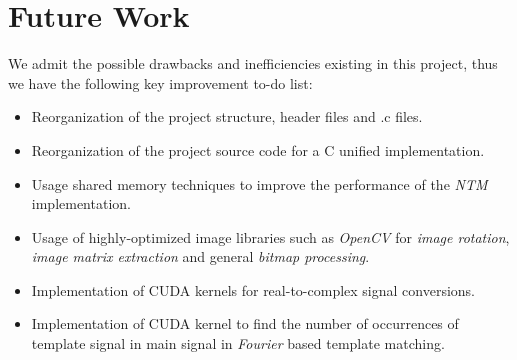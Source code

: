 \chapter{Future Work}
We admit the possible drawbacks and inefficiencies existing in this project, thus we have the following key improvement to-do list:
\begin{itemize}
	\item Reorganization of the project structure, header files and .c files.
	\item Reorganization of the project source code for a C unified implementation.
	\item Usage shared memory techniques to improve the performance of the \textit{NTM} implementation.
	\item Usage of highly-optimized image libraries such as \textit{OpenCV} for \textit{image rotation}, \textit{image matrix extraction} and general \textit{bitmap processing}.
	\item Implementation of CUDA kernels for real-to-complex signal conversions.
	\item Implementation of CUDA kernel to find the number of occurrences of template signal in main signal in \textit{Fourier} based template matching.
\end{itemize}